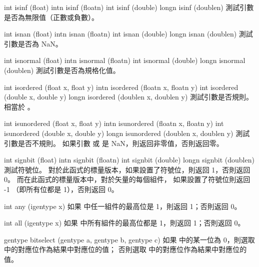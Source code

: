 int isinf (float)
intn isinf (floatn)
int isinf (double)
longn isinf (doublen)
\stopbuffer
{}
測試引數是否為無限值（正數或負數）。
\stopbuffer

int isnan (float)
intn isnan (floatn)
int isnan (double)
longn isnan (doublen)
\stopbuffer
{}
測試引數是否為 NaN。
\stopbuffer

int isnormal (float)
intn isnormal (floatn)
int isnormal (double)
longn isnormal (doublen)
\stopbuffer
{}
測試引數是否為規格化值。
\stopbuffer

int isordered (float x, float y)
intn isordered (floatn x, floatn y)
int isordered (double x, double y)
longn isordered (doublen x, doublen y)
\stopbuffer
{}
測試引數是否規則。
相當於 。
\stopbuffer

int isunordered (float x, float y)
intn isunordered (floatn x, floatn y)
int isunordered (double x, double y)
longn isunordered (doublen x, doublen y)
\stopbuffer
{}
測試引數是否不規則。
如果引數  或  是 NaN，則返回非零值，否則返回零。
\stopbuffer

int signbit (float)
intn signbit (floatn)
int signbit (double)
longn signbit (doublen)
\stopbuffer
{}
測試符號位。
對於此函式的標量版本，如果設置了符號位，則返回 1，否則返回 0。
而在此函式的標量版本中，對於矢量的每個組件，
如果設置了符號位則返回 -1 （即所有位都是 1），否則返回 0。
\stopbuffer

int any (igentype x)
\stopbuffer
{}
如果  中任一組件的最高位是 1，則返回 1；否則返回 0。
\stopbuffer

int all (igentype x)
\stopbuffer
{}
如果  中所有組件的最高位都是 1，則返回 1；否則返回 0。
\stopbuffer

gentype bitselect (gentype a,
		gentype b,
		gentype c)
\stopbuffer
{}
如果  中的某一位為 0，則選取  中的對應位作為結果中對應位的值；
否則選取  中的對應位作為結果中對應位的值。
\stopbuffer

